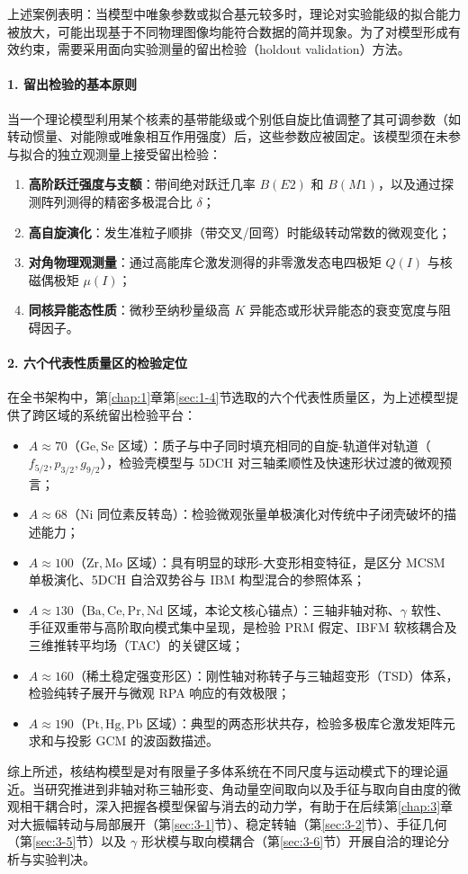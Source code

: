上述案例表明：当模型中唯象参数或拟合基元较多时，理论对实验能级的拟合能力被放大，可能出现基于不同物理图像均能符合数据的简并现象。为了对模型形成有效约束，需要采用面向实验测量的留出检验（holdout validation）方法。

\paragraph{1. 留出检验的基本原则}
当一个理论模型利用某个核素的基带能级或个别低自旋比值调整了其可调参数（如转动惯量、对能隙或唯象相互作用强度）后，这些参数应被固定。该模型须在未参与拟合的独立观测量上接受留出检验：
\begin{enumerate}
\item \textbf{高阶跃迁强度与支额}：带间绝对跃迁几率 $B(E2)$ 和 $B(M1)$，以及通过探测阵列测得的精密多极混合比 $\delta$；
\item \textbf{高自旋演化}：发生准粒子顺排（带交叉/回弯）时能级转动常数的微观变化；
\item \textbf{对角物理观测量}：通过高能库仑激发测得的非零激发态电四极矩 $Q(I)$ 与核磁偶极矩 $\mu(I)$；
\item \textbf{同核异能态性质}：微秒至纳秒量级高 $K$ 异能态或形状异能态的衰变宽度与阻碍因子。
\end{enumerate}

\paragraph{2. 六个代表性质量区的检验定位}
在全书架构中，第\ref{chap:1}章第\ref{sec:1-4}节选取的六个代表性质量区，为上述模型提供了跨区域的系统留出检验平台：
\begin{itemize}
\item $A \approx 70$（$\mathrm{Ge, Se}$ 区域）：质子与中子同时填充相同的自旋-轨道伴对轨道（$f_{5/2}, p_{3/2}, g_{9/2}$），检验壳模型与 5DCH 对三轴柔顺性及快速形状过渡的微观预言；
\item $A \approx 68$（$\mathrm{Ni}$ 同位素反转岛）：检验微观张量单极演化对传统中子闭壳破坏的描述能力；
\item $A \approx 100$（$\mathrm{Zr, Mo}$ 区域）：具有明显的球形-大变形相变特征，是区分 MCSM 单极演化、5DCH 自洽双势谷与 IBM 构型混合的参照体系；
\item $A \approx 130$（$\mathrm{Ba, Ce, Pr, Nd}$ 区域，本论文核心锚点）：三轴非轴对称、$\gamma$ 软性、手征双重带与高阶取向模式集中呈现，是检验 PRM 假定、IBFM 软核耦合及三维推转平均场（TAC）的关键区域；
\item $A \approx 160$（稀土稳定强变形区）：刚性轴对称转子与三轴超变形（TSD）体系，检验纯转子展开与微观 RPA 响应的有效极限；
\item $A \approx 190$（$\mathrm{Pt, Hg, Pb}$ 区域）：典型的两态形状共存，检验多极库仑激发矩阵元求和与投影 GCM 的波函数描述。
\end{itemize}

综上所述，核结构模型是对有限量子多体系统在不同尺度与运动模式下的理论逼近。当研究推进到非轴对称三轴形变、角动量空间取向以及手征与取向自由度的微观相干耦合时，深入把握各模型保留与消去的动力学，有助于在后续第\ref{chap:3}章对大振幅转动与局部展开（第\ref{sec:3-1}节）、稳定转轴（第\ref{sec:3-2}节）、手征几何（第\ref{sec:3-5}节）以及 $\gamma$ 形状模与取向模耦合（第\ref{sec:3-6}节）开展自洽的理论分析与实验判决。
